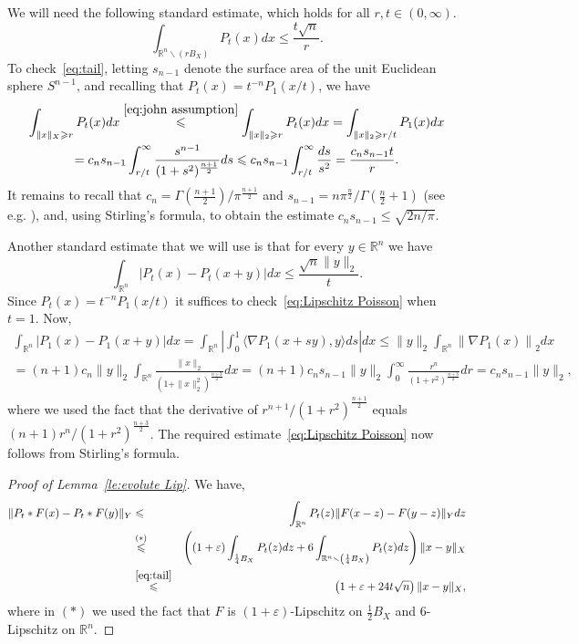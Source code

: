 \documentclass[12pt,reqno]{amsart}
\theoremstyle{plain}
\newtheorem{lemma}[theorem]{Lemma}
\theoremstyle{definition}
\newcommand{\e}{\varepsilon}
\renewcommand{\le}{\leqslant}
\renewcommand{\ge}{\geqslant}
\newcommand{\R}{\mathbb R}
\renewcommand{\setminus}{\smallsetminus}
\begin{document}
 We will need the following standard estimate, which holds for all $r,t\in (0,\infty)$.
\begin{equation}\label{eq:tail}
\int_{\R^n\setminus\left(rB_X\right)}P_t(x)dx\le \frac{t\sqrt{n}}{r}.
\end{equation}
To check~\eqref{eq:tail}, letting $s_{n-1}$ denote the surface area of the unit Euclidean sphere $S^{n-1}$, and recalling that $P_t(x)=t^{-n}P_1(x/t)$, we have
\begin{multline*}
\int_{\|x\|_X\ge r} P_t(x)dx \stackrel{\eqref{eq:john assumption}}{\le} \int_{\|x\|_2\ge r} P_t(x)dx=\int_{\|x\|_2\ge r/t} P_1(x)dx\\=c_ns_{n-1}\int_{r/t}^\infty\frac{s^{n-1}}{(1+s^2)^{\frac{n+1}{2}}}ds
\le c_ns_{n-1}\int_{r/t}^\infty \frac{ds}{s^2}=\frac{c_ns_{n-1}t}{r}.
\end{multline*}
It remains to recall that $c_n = \Gamma\left(\frac{n+1}2\right)/\pi^{\frac{n+1}2}$ and $
s_{n-1}=n\pi^{\frac{n}{2}}/\Gamma\left(\frac{n}{2}+1\right)$ (see e.g. \cite[Sec.~1]{Ball97}), and, using Stirling's formula, to obtain the estimate $c_ns_{n-1}\le \sqrt{2n/\pi}$.

Another standard estimate that we will use is that for every $y\in \R^n$ we have
\begin{equation}\label{eq:Lipschitz Poisson}
\int_{\R^n} \left|P_t(x)-P_t(x+y)\right|dx\le \frac{\sqrt{n}\|y\|_2}{t}.
\end{equation}
Since $P_t(x)=t^{-n}P_1(x/t)$ it suffices to check~\eqref{eq:Lipschitz Poisson} when $t=1$. Now,
\begin{multline*}
\int_{\R^n} \left|P_1(x)-P_1(x+y)\right|dx=\int_{\R^n}\left|\int_0^1\langle \nabla P_1(x+sy),y\rangle ds\right|dx\le \|y\|_2\int_{\R^n}\left\|\nabla P_1(x)\right\|_2dx\\
=(n+1)c_n\|y\|_2\int_{\R^n}\frac{\|x\|_2}{\left(1+\|x\|_2^2\right)^{\frac{n+3}{2}}}dx=(n+1)c_ns_{n-1}
\|y\|_2\int_0^\infty \frac{r^n}{(1+r^2)^{\frac{n+3}{2}}}dr=c_ns_{n-1}\|y\|_2,
\end{multline*}
where we used the fact that the derivative of $r^{n+1}/(1+r^2)^{\frac{n+1}{2}}$ equals $(n+1)r^n/(1+r^2)^{\frac{n+3}{2}}$. The required estimate~\eqref{eq:Lipschitz Poisson} now follows from Stirling's formula.

\begin{proof}[Proof of Lemma~\ref{le:evolute Lip}] We have,
\begin{eqnarray*}
\|P_t*F(x)-P_t*F(y)\|_Y&\le& \int_{\R^n} P_t(z)\|F(x-z)-F(y-z)\|_Ydz\\
&\stackrel{(*)}{\le}& \left((1+\e)\int_{\frac14 B_X}P_t(z)dz+6\int_{\R^n\setminus \left(\frac14 B_X\right)} P_t(z)dz\right)\|x-y\|_X\\&\stackrel{\eqref{eq:tail}}{\le}& \left(1+\e+24t\sqrt{n}\right)\|x-y\|_X,
\end{eqnarray*}
where in $(*)$ we used the fact that $F$ is $(1+\e)$-Lipschitz on $\frac12 B_X$ and $6$-Lipschitz on $\R^n$.
\end{proof}
\end{document}
